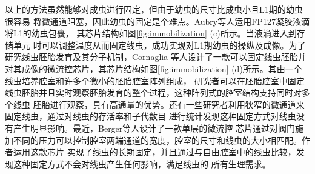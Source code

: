 	以上的方法虽然能够对成虫进行固定，但由于幼虫的尺寸比成虫小且L1期的幼虫很容易
	将微通道阻塞，因此幼虫的固定是个难点。Aubry等人\cite{Aubry2015Hydrogel}运用FP127凝胶液滴将L1的幼虫包裹，
	其芯片结构如图\ref{fig:immobilization} (c)所示。当液滴进入到存储单元
	时可以调整温度从而固定线虫，成功实现对L1期幼虫的操纵及成像。为了研究线虫胚胎发育及其分子机制，Cornaglia
	等人\cite{Cornaglia2015An}设计了一款可以固定线虫胚胎并对其成像的微流控芯片，其芯片结构如图\ref{fig:immobilization} (d)所示。其由一个线虫培养腔室和许多个微小的胚胎腔室阵列组成，
	研究者可以在胚胎腔室中固定线虫胚胎并且实时观察胚胎发育的整个过程，这种阵列式的腔室结构支持同时对多个线虫
	胚胎进行观察，具有高通量的优势。还有一些研究者利用狭窄的微通道来固定线虫\cite{Lee2014A,Hulme2007A}，通过对线虫的存活率和子代数目
	进行统计发现这种固定方式对线虫没有产生明显影响。最近，Berger等人\cite{berger2018long}设计了一款单层的微流控
	芯片通过对阀门施加不同的压力可以控制腔室两端通道的宽度，腔室的尺寸和线虫的大小相匹配。作者运用这款芯片
	实现了线虫的长期固定，并且通过与自由腔室中的线虫比较，发现这种固定方式不会对线虫产生任何影响，满足线虫的
	所有生理需求。

